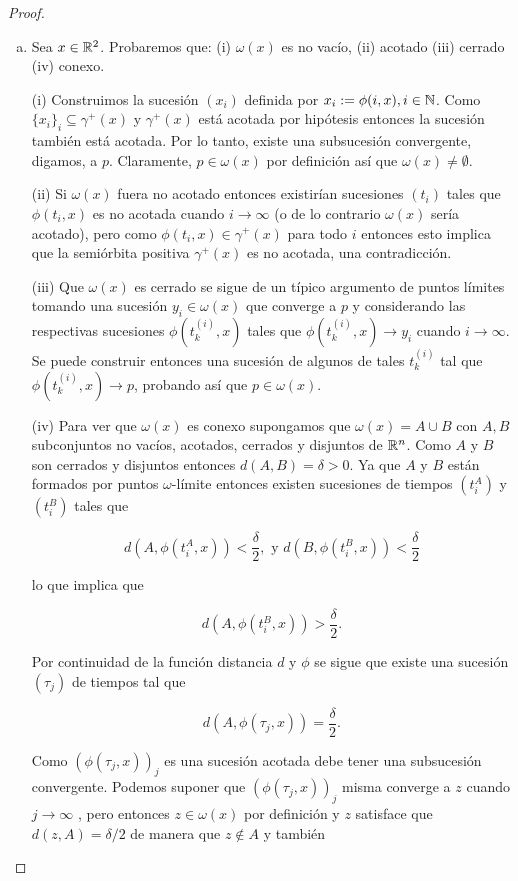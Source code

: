 \begin{proof}
\begin{enumerate}[(a)]
	\item Sea $x \in {\ensuremath{\mathbb{R}}}^2$. Probaremos que: (i) $\omega(x)$ es no vacío, (ii) acotado (iii) cerrado (iv) conexo.

	(i) Construimos la sucesión $(x_i)$ definida por $ x_i:= \phi(i, x), i \in {\ensuremath{\mathbb{N}}}$. Como $\{x_i\}_i \subseteq \gamma^+(x)$ y $\gamma^+(x)$ está acotada por hipótesis entonces la sucesión también está acotada. Por lo tanto, existe una subsucesión convergente, digamos, a $p$. Claramente, $p \in \omega(x)$ por definición así que $\omega(x) \neq \emptyset$.

	(ii) Si $\omega(x)$ fuera no acotado entonces existirían sucesiones $(t_i)$ tales que $\phi(t_i, x)$ es no acotada cuando $i \to \infty$ (o de lo contrario $\omega(x)$ sería acotado), pero como $\phi(t_i, x) \in \gamma^+(x)$ para todo $i$ entonces esto implica que la semiórbita positiva $\gamma^+(x)$ es no acotada, una contradicción.

	(iii) Que $\omega(x)$ es cerrado se sigue de un típico argumento de puntos límites tomando una sucesión $y_i \in \omega(x)$ que converge a $p$ y considerando las respectivas sucesiones $\phi(t_k^{(i)}, x)$ tales que $\phi(t_k^{(i)}, x) \to y_i$ cuando $i \to \infty$. Se puede construir entonces una sucesión de algunos de tales $t_k^{(i)}$ tal que $\phi(t_k^{(i)}, x) \to p$, probando así que $p \in \omega(x)$.

	(iv) Para ver que $\omega(x)$ es conexo supongamos que $\omega(x) = A \cup B$ con $A,B$ subconjuntos no vacíos, acotados, cerrados y disjuntos de ${\mathbb{R}}^n$.
	Como $A$ y $B$ son cerrados y disjuntos entonces $d(A,B) = \delta > 0$. Ya que $A$ y $B$ están formados por puntos $\omega$-límite entonces existen sucesiones de tiempos $(t_i^A)$ y $(t_i^B)$ tales que

$$ d(A, \phi(t_i^A, x)) < \frac{\delta}{2}, \text{ y } d(B, \phi(t_i^B, x)) < \frac{\delta}{2}$$

lo que implica que

$$ d(A, \phi(t_i^B, x)) > \frac{\delta}{2}. $$

Por continuidad de la función distancia $d$ y $\phi$ se sigue que existe una sucesión $(\tau_j)$ de tiempos tal que

$$ d(A, \phi(\tau_j, x)) = \frac{\delta}{2}. $$

Como $(\phi(\tau_j, x))_j$ es una sucesión acotada debe tener una subsucesión convergente. Podemos suponer que $(\phi(\tau_j, x))_j$ misma converge a $z$ cuando $j \to \infty$ , pero entonces $z \in \omega(x)$ por definición y $z$ satisface que $d(z,A) = \delta/2$ de manera que $z \notin A$ y también


\end{enumerate}
\end{proof}

